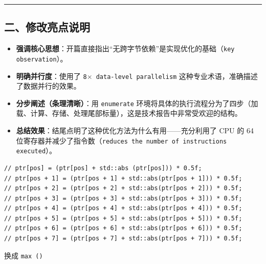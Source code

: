 \documentclass[11pt, a4paper]{article}
\begin{document}
\begin{aibox}
\begin{center}\rule{\textwidth}{0.4pt}\end{center}

\subsection*{二、修改亮点说明}

\begin{itemize}
    \item \textbf{强调核心思想}：开篇直接指出“无跨字节依赖”是实现优化的基础（\texttt{key observation}）。
    \item \textbf{明确并行度}：使用了 \texttt{8$\times$ data-level parallelism} 这种专业术语，准确描述了数据并行的效果。
    \item \textbf{分步阐述（条理清晰）}：用 \texttt{enumerate} 环境将具体的执行流程分为了四步（加载、计算、存储、处理尾部标量），这是技术报告中非常受欢迎的结构。
    \item \textbf{总结效果}：结尾点明了这种优化方法为什么有用——充分利用了 CPU 的 64 位寄存器并减少了指令数（\texttt{reduces the number of instructions executed}）。
\end{itemize}
\end{aibox}

\vspace{1.5em}

\begin{userbox}
\begin{verbatim}
// ptr[pos] = (ptr[pos] + std::abs (ptr[pos])) * 0.5f;
// ptr[pos + 1] = (ptr[pos + 1] + std::abs(ptr[pos + 1])) * 0.5f;
// ptr[pos + 2] = (ptr[pos + 2] + std::abs(ptr[pos + 2])) * 0.5f;
// ptr[pos + 3] = (ptr[pos + 3] + std::abs(ptr[pos + 3])) * 0.5f;
// ptr[pos + 4] = (ptr[pos + 4] + std::abs(ptr[pos + 4])) * 0.5f;
// ptr[pos + 5] = (ptr[pos + 5] + std::abs(ptr[pos + 5])) * 0.5f;
// ptr[pos + 6] = (ptr[pos + 6] + std::abs(ptr[pos + 6])) * 0.5f;
// ptr[pos + 7] = (ptr[pos + 7] + std::abs(ptr[pos + 7])) * 0.5f;
\end{verbatim}

换成 \texttt{max ()}
\end{userbox}
\end{document}
